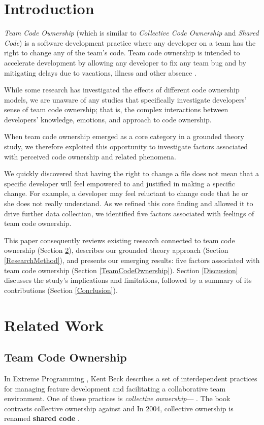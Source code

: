 \section{Introduction}
\textit{Team Code Ownership} (which is similar to \textit{Collective Code Ownership} and \textit{Shared Code}) is a software development practice where any developer on a team has the right to change any of the team's code. Team code ownership is intended to accelerate development by allowing any developer to fix any team bug and by mitigating delays due to vacations, illness and other absence \cite{BeckExtremeProgramming2004}.
 
While some research has investigated the effects of different code ownership models, we are unaware of any studies that specifically investigate developers' sense of team code ownership; that is, the complex interactions between developers' knowledge, emotions, and approach to code ownership.  

When team code ownership emerged as a core category in a grounded theory study, we therefore exploited this opportunity to investigate factors associated with perceived code ownership and related phenomena. 

We quickly discovered that having the right to change a file does not mean that a specific developer will feel empowered to and justified in making a specific change. For example, a developer may feel reluctant to change code that he or she does not really understand. As we refined this core finding and allowed it to drive further data collection, we identified five factors associated with feelings of team code ownership. 

This paper consequently reviews existing research connected to team code ownership (Section \ref{RelatedWork}), describes our grounded theory approach (Section \ref{ResearchMethod}), and presents our emerging results: five factors associated with team code ownership (Section \ref{TeamCodeOwnership}). Section \ref{Discussion} discusses the study's implications and limitations, followed by a summary of its contributions (Section \ref{Conclusion}).
\section{Related Work}
\label{RelatedWork}

\subsection{Team Code Ownership}
In Extreme Programming \cite{BeckExtremeProgramming2004}, Kent Beck describes a set of interdependent practices for managing feature development and facilitating a collaborative team environment. One of these practices is \textit{collective ownership}--- \cite{BeckExtremeProgramming2000}. The book contrasts collective ownership against  and  In 2004, collective ownership is renamed \textbf{shared code} \cite{BeckExtremeProgramming2004}.

